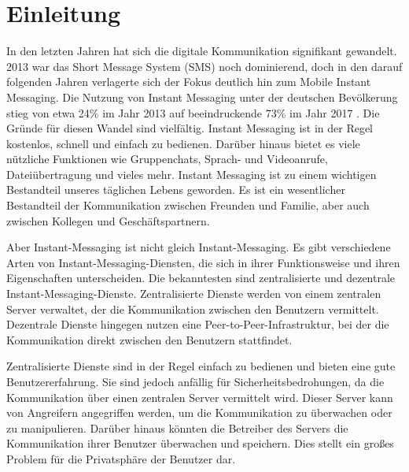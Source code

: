\chapter{Einleitung}



In den letzten Jahren hat sich die digitale Kommunikation signifikant gewandelt. 2013 war das Short Message System (SMS) noch dominierend, doch in den darauf folgenden Jahren verlagerte sich der Fokus deutlich hin zum Mobile Instant Messaging. Die Nutzung von Instant Messaging unter der deutschen Bevölkerung stieg von etwa 24\% im Jahr 2013 auf beeindruckende 73\% im Jahr 2017 \parencite{Hedda_digiKommunikationVeraendert}. Die Gründe für diesen Wandel sind vielfältig. Instant Messaging ist in der Regel kostenlos, schnell und einfach zu bedienen. Darüber hinaus bietet es viele nützliche Funktionen wie Gruppenchats, Sprach- und Videoanrufe, Dateiübertragung und vieles mehr. Instant Messaging ist zu einem wichtigen Bestandteil unseres täglichen Lebens geworden. Es ist ein wesentlicher Bestandteil der Kommunikation zwischen Freunden und Familie, aber auch zwischen Kollegen und Geschäftspartnern. 

Aber Instant-Messaging ist nicht gleich Instant-Messaging. Es gibt verschiedene Arten von Instant-Messaging-Diensten, die sich in ihrer Funktionsweise und ihren Eigenschaften unterscheiden. Die bekanntesten sind zentralisierte und dezentrale Instant-Messaging-Dienste. Zentralisierte Dienste werden von einem zentralen Server verwaltet, der die Kommunikation zwischen den Benutzern vermittelt. Dezentrale Dienste hingegen nutzen eine Peer-to-Peer-Infrastruktur, bei der die Kommunikation direkt zwischen den Benutzern stattfindet. 

Zentralisierte Dienste sind in der Regel einfach zu bedienen und bieten eine gute Benutzererfahrung. Sie sind jedoch anfällig für Sicherheitsbedrohungen, da die Kommunikation über einen zentralen Server vermittelt wird. Dieser Server kann von Angreifern angegriffen werden, um die Kommunikation zu überwachen oder zu manipulieren. Darüber hinaus könnten die Betreiber des Servers die Kommunikation ihrer Benutzer überwachen und speichern. Dies stellt ein großes Problem für die Privatsphäre der Benutzer dar.

